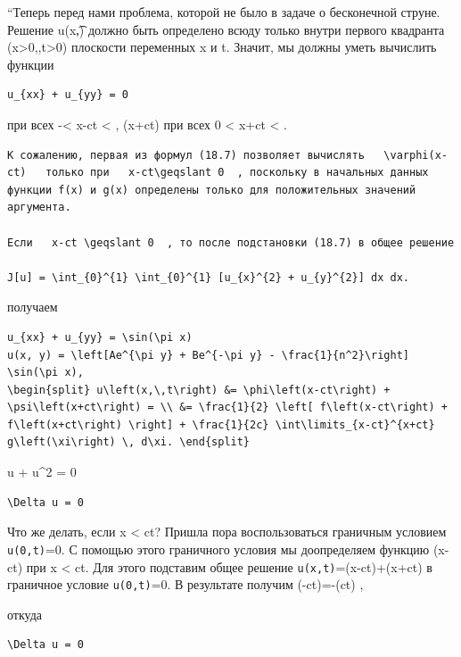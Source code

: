 \documentclass[
  ukrainian,
]{article}
\begin{document}
``Теперь перед нами проблема, которой не было в задаче о бесконечной
струне. Решение u\left(x,\t\right) должно быть определено всюду только
внутри первого квадранта (x\textgreater0,,t\textgreater0) плоскости
переменных x и t. Значит, мы должны уметь вычислить функции

\begin{verbatim}
u_{xx} + u_{yy} = 0
\end{verbatim}

при всех -\infty \textless{} x-ct \textless{} \infty  , \psi(x+ct) при
всех 0 \textless{} x+ct \textless{} \infty  .

\begin{verbatim}
К сожалению, первая из формул (18.7) позволяет вычислять   \varphi(x-ct)   только при   x-ct\geqslant 0  , поскольку в начальных данных функции f(x) и g(x) определены только для положительных значений аргумента.

Если   x-ct \geqslant 0  , то после подстановки (18.7) в общее решение

J[u] = \int_{0}^{1} \int_{0}^{1} [u_{x}^{2} + u_{y}^{2}] dx dx.
\end{verbatim}

получаем

\begin{verbatim}
u_{xx} + u_{yy} = \sin(\pi x)
u(x, y) = \left[Ae^{\pi y} + Be^{-\pi y} - \frac{1}{n^2}\right] \sin(\pi x),
\begin{split} u\left(x,\,t\right) &= \phi\left(x-ct\right) + \psi\left(x+ct\right) = \\ &= \frac{1}{2} \left[ f\left(x-ct\right) + f\left(x+ct\right) \right] + \frac{1}{2c} \int\limits_{x-ct}^{x+ct} g\left(\xi\right) \, d\xi. \end{split}
\end{verbatim}

 u + u\^{}2 = 0

\begin{verbatim}
\Delta u = 0
\end{verbatim}

Что же делать, если x \textless{} ct? Пришла пора воспользоваться
граничным условием \texttt{u(0,t)}=0. С помощью этого граничного условия
мы доопределяем функцию \varphi(x-ct) при x \textless{} ct. Для этого
подставим общее решение \texttt{u(x,t)}=\varphi(x-ct)+\psi(x+ct) в
граничное условие \texttt{u(0,t)}=0. В результате получим
\varphi(-ct)=-\psi(ct) ,

откуда

\begin{verbatim}
\Delta u = 0
\end{verbatim}
\end{document}
